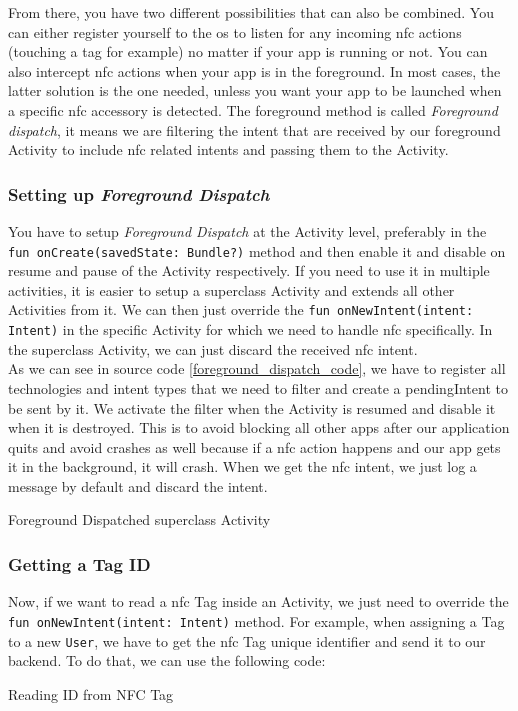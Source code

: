 \documentclass[twoside, openright,11pt,a4paper]{book}
\newenvironment{code}{\captionsetup{type=listing}}{}
\begin{document}
From there, you have two different possibilities that can also be combined. You can either register yourself to the \gls{os} to listen for any incoming \gls{nfc} actions (touching a tag for example) no matter if your app is running or not. You can also intercept \gls{nfc} actions when your app is in the foreground. In most cases, the latter solution is the one needed, unless you want your app to be launched when a specific \gls{nfc} accessory is detected. The foreground method is called \emph{Foreground dispatch}, it means we are filtering the intent that are received by our foreground Activity to include \gls{nfc} related intents and passing them to the Activity.

\subsubsection{Setting up \emph{Foreground Dispatch}}
\label{foreground_dispatch}
You have to setup \emph{Foreground Dispatch}\cite{android:doc:nfc_foregroundDispatch} at the Activity level, preferably in the \texttt{fun onCreate(savedState: Bundle?)} method and then enable it and disable on resume and pause of the Activity respectively. If you need to use it in multiple activities, it is easier to setup a superclass Activity and extends all other Activities from it. We can then just override the \texttt{fun onNewIntent(intent: Intent)} in the specific Activity for which we need to handle \gls{nfc} specifically. In the superclass Activity, we can just discard the received \gls{nfc} intent.\\

As we can see in source code \ref{foreground_dispatch_code}, we have to register all technologies and intent types that we need to filter and create a pendingIntent to be sent by it. We activate the filter when the Activity is resumed and disable it when it is destroyed. This is to avoid blocking all other apps after our application quits and avoid crashes as well because if a \gls{nfc} action happens and our app gets it in the background, it will crash. When we get the \gls{nfc} intent, we just log a message by default and discard the intent.

\begin{code}
	\caption{Foreground Dispatched superclass Activity}
	\label{foreground_dispatch_code}
\end{code}
\subsubsection{Getting a Tag ID}
Now, if we want to read a \gls{nfc} Tag inside an Activity, we just need to override the \texttt{fun onNewIntent(intent: Intent)} method. For example, when assigning a Tag to a new \verb+User+, we have to get the \gls{nfc} Tag unique identifier and send it to our backend. To do that, we can use the following code:
\begin{code}
	\caption{Reading ID from NFC Tag}
\end{code}
\end{document}
